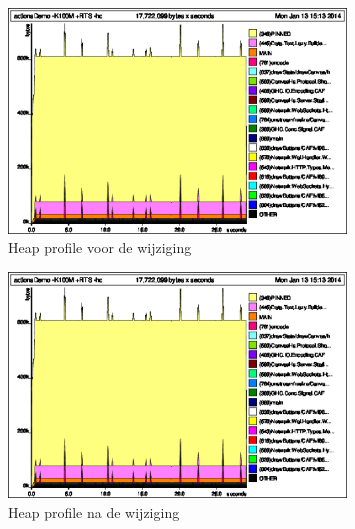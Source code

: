 \begin{figure}
\begin{center}
\includegraphics[keepaspectratio,width=0.8\textwidth]{./images/actionsDemoAfterByteStrings.eps}
\caption{Heap profile voor de wijziging}
\label{fig:sub1}
\end{center}
\end{figure}

\begin{figure}
\begin{center}
\includegraphics[keepaspectratio,width=0.8\textwidth]{./images/actionsDemoAfterByteStrings.eps}
\caption{Heap profile na de wijziging}
\label{fig:sub1}
\end{center}
\end{figure}


